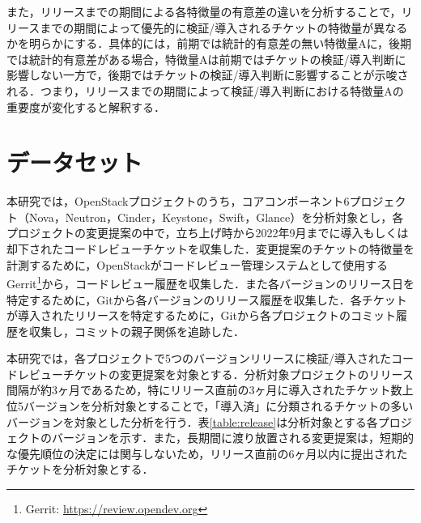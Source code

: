 \documentclass[11pt]{jreport}
\begin{document}
また，リリースまでの期間による各特徴量の有意差の違いを分析することで，リリースまでの期間によって優先的に検証/導入されるチケットの特徴量が異なるかを明らかにする．具体的には，前期では統計的有意差の無い特徴量Aに，後期では統計的有意差がある場合，特徴量Aは前期ではチケットの検証/導入判断に影響しない一方で，後期ではチケットの検証/導入判断に影響することが示唆される．つまり，リリースまでの期間によって検証/導入判断における特徴量Aの重要度が変化すると解釈する．


\section{データセット}\label{sec:dataset}
本研究では，OpenStackプロジェクトのうち，コアコンポーネント6プロジェクト（Nova，Neutron，Cinder，Keystone，Swift，Glance）を分析対象とし，各プロジェクトの変更提案の中で，立ち上げ時から2022年9月までに導入もしくは却下されたコードレビューチケットを収集した．変更提案のチケットの特徴量を計測するために，OpenStackがコードレビュー管理システムとして使用するGerrit\footnote{Gerrit: \url{https://review.opendev.org}}から，コードレビュー履歴を収集した．また各バージョンのリリース日を特定するために，Gitから各バージョンのリリース履歴を収集した．各チケットが導入されたリリースを特定するために，Gitから各プロジェクトのコミット履歴を収集し，コミットの親子関係を追跡した．

本研究では，各プロジェクトで5つのバージョンリリースに検証/導入されたコードレビューチケットの変更提案を対象とする．分析対象プロジェクトのリリース間隔が約3ヶ月であるため，特にリリース直前の3ヶ月に導入されたチケット数上位5バージョンを分析対象とすることで，「導入済」に分類されるチケットの多いバージョンを対象とした分析を行う．表\ref{table:release}は分析対象とする各プロジェクトのバージョンを示す．また，長期間に渡り放置される変更提案は，短期的な優先順位の決定には関与しないため，リリース直前の6ヶ月以内に提出されたチケットを分析対象とする．
\end{document}
